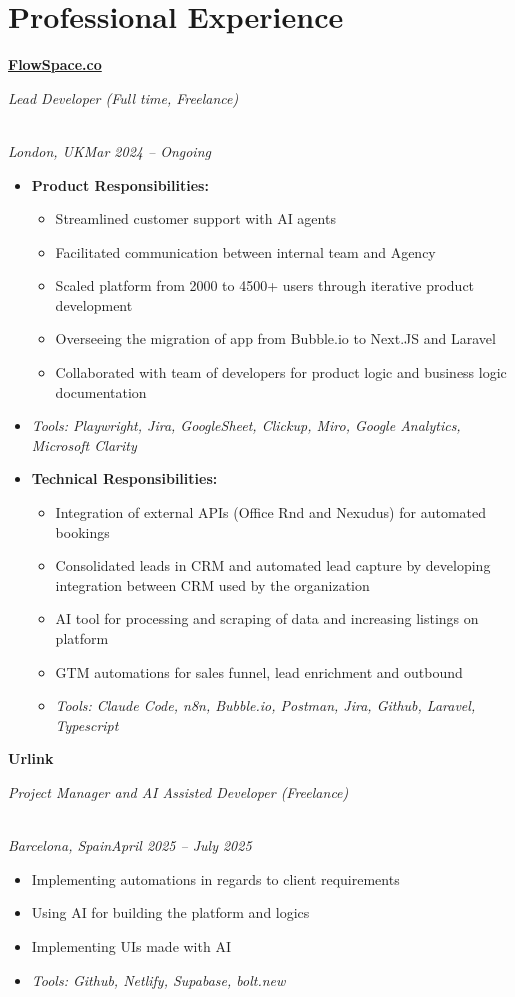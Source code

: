 \documentclass[a4paper,10pt]{article}
\newcommand{\role}[4]{\vspace{3pt}\noindent\hspace{0.6em}\parbox[t]{0.38\textwidth}{\raggedright\textbf{#1}}\hfill\parbox[t]{0.58\textwidth}{\raggedleft\textit{#2}}\\{\textit{#3}\hfill\textit{#4}}\vspace{1pt}}
\begin{document}
\section{Professional Experience}
\role{\href{https://flowspace.co}{FlowSpace.co}}{Lead Developer (Full time, Freelance)}{London, UK}{Mar 2024 -- Ongoing}
\begin{itemize}
\item \textbf{Product Responsibilities:}
\begin{itemize}[label=--]
\item Streamlined customer support with AI agents
\item Facilitated communication between internal team and Agency
\item Scaled platform from 2000 to 4500+ users through iterative product development
\item Overseeing the migration of app from Bubble.io to Next.JS and Laravel
\item Collaborated with team of developers for product logic and business logic documentation
\end{itemize}
\item \textit{Tools: Playwright, Jira, GoogleSheet, Clickup, Miro, Google Analytics, Microsoft Clarity}
\item \textbf{Technical Responsibilities:}
\begin{itemize}[label=--]
\item Integration of external APIs (Office Rnd and Nexudus) for automated bookings
\item Consolidated leads in CRM and automated lead capture by developing integration between CRM used by the organization
\item AI tool for processing and scraping of data and increasing listings on platform
\item GTM automations for sales funnel, lead enrichment and outbound
\item \textit{Tools: Claude Code, n8n, Bubble.io, Postman, Jira, Github, Laravel, Typescript}
\end{itemize}
\end{itemize}

\role{Urlink}{Project Manager and AI Assisted Developer (Freelance)}{Barcelona, Spain}{April 2025 -- July 2025}
\begin{itemize}
\item Implementing automations in regards to client requirements
\item Using AI for building the platform and logics
\item Implementing UIs made with AI
\item \textit{Tools: Github, Netlify, Supabase, bolt.new}
\end{itemize}
\end{document}
